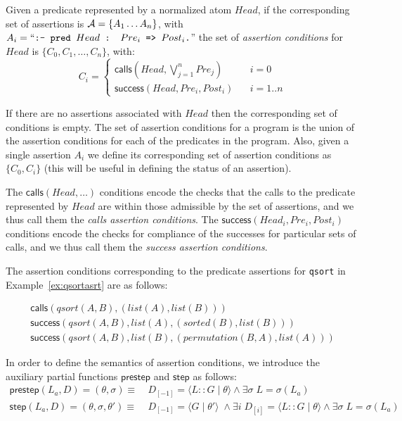 \documentclass{llncs}
\newcommand{\A}
  {\ensuremath{{\cal A}}}
\newcommand{\gd}[0]{\mid}
\newcommand{\state}[2]
  {\ensuremath{\langle #1 \gd{} #2 \rangle}}
\newcommand{\currstate}[1]{\ensuremath{{#1}_{[-1]}}}
\newcommand{\nthstate}[2]{\ensuremath{{#1}_{[#2]}}}
\newcommand{\callsAsr}[2]{\ensuremath{\textsf{calls}(#1, #2)}}
\newcommand{\successAsr}[3]{\ensuremath{\textsf{success}(#1, #2, #3)}}
\begin{document}
\begin{definition}
  \label{def:assrt-cond}
  Given a predicate represented by a normalized atom $Head$, if the
  corresponding set of assertions is $\A = \{A_1 \ldots A_n\}$, with
  $A_i = ``\texttt{:- pred } Head \texttt{ : } Pre_i \texttt{ => }
  Post_i \texttt{.}$'' the set of \emph{assertion conditions} for
  $Head$ is $\{ C_0, C_1, \ldots , C_n\}$, 
  with:
  \[
    C_i = \left\{
    \begin{array}{ll}
      \callsAsr{Head}{\bigvee _{j = 1}^{n} Pre_j}
    & ~~~~i = 0 
    \\
      \successAsr{Head}{Pre_i}{Post_i}
    & ~~~~i = 1..n
    \end{array}
    \right.
  \]
\end{definition}

If there are no assertions associated with $Head$ then the
corresponding set of conditions is empty.
The set of assertion conditions for a program is the union of the
assertion conditions for each of the predicates in the program.
Also, given a single assertion $A_i$ we define its corresponding set
of assertion conditions as $\{ C_0, C_i \}$ (this will be useful in
defining the status of an assertion).

The $\callsAsr{Head}{\ldots}$ conditions encode the checks that the
calls to the predicate represented by $Head$ are within those
admissible by the set of assertions, and we thus call them the
\emph{calls assertion conditions}.  The
$\successAsr{Head_i}{Pre_i}{Post_i}$ conditions encode the checks for
compliance of the successes for particular sets of calls, and we thus
call them the \emph{success assertion conditions}.

\begin{example}
  The assertion conditions corresponding to the predicate assertions
  for \texttt{qsort} in Example~\ref{ex:qsortasrt} are as follows:
  \begin{small}
    \[
    \begin{array}{l}
      \callsAsr{qsort(A,B)}{(list(A),list(B))}
    \\
      \successAsr{qsort(A,B)}{list(A)}{(sorted(B),list(B))}
    \\
      \successAsr{qsort(A,B)}{list(B)}{(permutation(B,A), list(A))}
    \end{array}
    \]
  \end{small}
\end{example}

In order to define the semantics of assertion conditions, we introduce 
the auxiliary partial functions $\textsf{prestep}$ and $\textsf{step}$
as follows:
\begin{align*}
  \textsf{prestep}(L_a,D)=(\theta,\sigma) \equiv &~
  \currstate{D}=\state{L::G}{\theta} \wedge
  \exists \sigma\;L=\sigma(L_a) \\
  \textsf{step}(L_a,D)=(\theta,\sigma,\theta') \equiv &~
    \currstate{D}=\state{G}{\theta'}\;
    \wedge
    \exists i\; \nthstate{D}{i} = \state{L::G}{\theta}
    \wedge \exists \sigma\;L=\sigma(L_a)
\end{align*}
\end{document}
